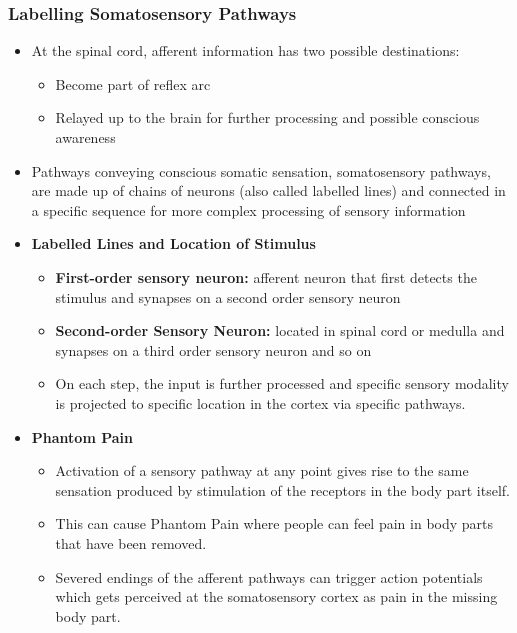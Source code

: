 \documentclass[11pt]{article}
\begin{document}
\subsubsection{Labelling Somatosensory Pathways}
\begin{itemize}
\item At the spinal cord, afferent information has two possible destinations:
\begin{itemize}
\item Become part of reflex arc
\item Relayed up to the brain for further processing and possible conscious awareness
\end{itemize}
\item Pathways conveying conscious somatic sensation, somatosensory pathways, are made up of chains of neurons (also called labelled lines) and connected in a specific sequence for more complex processing of sensory information
\item \textbf{Labelled Lines and Location of Stimulus}
\begin{itemize}
\item \textbf{First-order sensory neuron:} afferent neuron that first detects the stimulus and synapses on a second order sensory neuron
\item \textbf{Second-order Sensory Neuron: }located in spinal cord or medulla and synapses on a third order sensory neuron and so on
\item On each step, the input is further processed and specific sensory modality is projected to specific location in the cortex via specific pathways.
\end{itemize}
\item \textbf{Phantom Pain}
\begin{itemize}
\item Activation of a sensory pathway at any point gives rise to the same sensation produced by stimulation of the receptors in the body part itself. 
\item This can cause Phantom Pain where people can feel pain in body parts that have been removed.
\item Severed endings of the afferent pathways can trigger action potentials which gets perceived at the somatosensory cortex as pain in the missing body part. 
\end{itemize}
\end{itemize}
\end{document}
